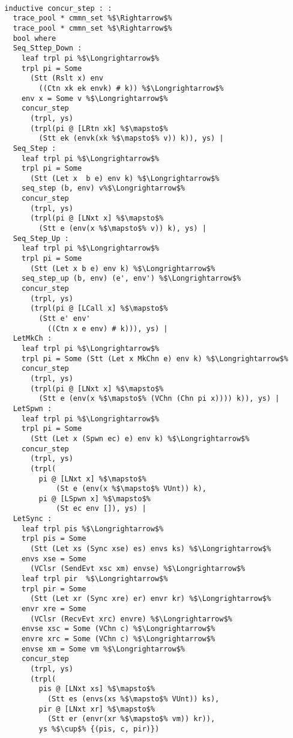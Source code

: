\documentclass{article}
\begin{document}
\begin{lstlisting}[style=codestyle1, escapechar=\%]

  inductive concur_step : :
    trace_pool * cmmn_set %$\Rightarrow$%
    trace_pool * cmmn_set %$\Rightarrow$%
    bool where 
    Seq_Sttep_Down :
      leaf trpl pi %$\Longrightarrow$%
      trpl pi = Some
        (Stt (Rslt x) env
          ((Ctn xk ek envk) # k)) %$\Longrightarrow$%
      env x = Some v %$\Longrightarrow$%
      concur_step
        (trpl, ys)
        (trpl(pi @ [LRtn xk] %$\mapsto$%
          (Stt ek (envk(xk %$\mapsto$% v)) k)), ys) |
    Seq_Step :
      leaf trpl pi %$\Longrightarrow$%
      trpl pi = Some
        (Stt (Let x  b e) env k) %$\Longrightarrow$%
      seq_step (b, env) v%$\Longrightarrow$%
      concur_step
        (trpl, ys)
        (trpl(pi @ [LNxt x] %$\mapsto$%
          (Stt e (env(x %$\mapsto$% v)) k), ys) |
    Seq_Step_Up : 
      leaf trpl pi %$\Longrightarrow$%
      trpl pi = Some
        (Stt (Let x b e) env k) %$\Longrightarrow$%
      seq_step_up (b, env) (e', env') %$\Longrightarrow$%
      concur_step
        (trpl, ys)
        (trpl(pi @ [LCall x] %$\mapsto$%
          (Stt e' env'
            ((Ctn x e env) # k))), ys) |
    LetMkCh : 
      leaf trpl pi %$\Longrightarrow$%
      trpl pi = Some (Stt (Let x MkChn e) env k) %$\Longrightarrow$%
      concur_step
        (trpl, ys)
        (trpl(pi @ [LNxt x] %$\mapsto$%
          (Stt e (env(x %$\mapsto$% (VChn (Chn pi x)))) k)), ys) |
    LetSpwn :
      leaf trpl pi %$\Longrightarrow$%
      trpl pi = Some
        (Stt (Let x (Spwn ec) e) env k) %$\Longrightarrow$%
      concur_step
        (trpl, ys)
        (trpl(
          pi @ [LNxt x] %$\mapsto$%
              (St e (env(x %$\mapsto$% VUnt)) k), 
          pi @ [LSpwn x] %$\mapsto$%
              (St ec env []), ys) |
    LetSync :
      leaf trpl pis %$\Longrightarrow$%
      trpl pis = Some
        (Stt (Let xs (Sync xse) es) envs ks) %$\Longrightarrow$%
      envs xse = Some
        (VClsr (SendEvt xsc xm) envse) %$\Longrightarrow$%
      leaf trpl pir  %$\Longrightarrow$%
      trpl pir = Some
        (Stt (Let xr (Sync xre) er) envr kr) %$\Longrightarrow$%
      envr xre = Some
        (VClsr (RecvEvt xrc) envre) %$\Longrightarrow$%
      envse xsc = Some (VChn c) %$\Longrightarrow$%
      envre xrc = Some (VChn c) %$\Longrightarrow$%
      envse xm = Some vm %$\Longrightarrow$%
      concur_step
        (trpl, ys)
        (trpl(
          pis @ [LNxt xs] %$\mapsto$%
            (Stt es (envs(xs %$\mapsto$% VUnt)) ks), 
          pir @ [LNxt xr] %$\mapsto$%
            (Stt er (envr(xr %$\mapsto$% vm)) kr)), 
          ys %$\cup$% {(pis, c, pir)})

  \end{lstlisting}
\end{document}
